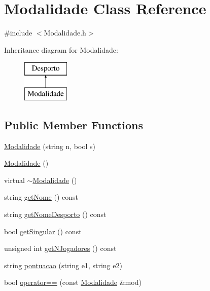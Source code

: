 \hypertarget{class_modalidade}{}\section{Modalidade Class Reference}
\label{class_modalidade}


{\ttfamily \#include $<$Modalidade.\+h$>$}

Inheritance diagram for Modalidade\+:\begin{figure}[H]
\begin{center}
\leavevmode
\includegraphics[height=2.000000cm]{class_modalidade}
\end{center}
\end{figure}
\subsection*{Public Member Functions}
\begin{DoxyCompactItemize}
\item 
\hyperlink{class_modalidade_a7d4201d3b89eb76cc5d147b642d32e72}{Modalidade} (string n, bool s)
\item 
\hyperlink{class_modalidade_aa60765d8148536471b4429e48858f883}{Modalidade} ()
\item 
virtual \hyperlink{class_modalidade_aea7526674a2128f030f58b8eff7c64bd}{$\sim$\+Modalidade} ()
\item 
string \hyperlink{class_modalidade_a46003f6a0dceac894f92971a6df9e4a7}{get\+Nome} () const 
\item 
string \hyperlink{class_modalidade_ac3326eec4d00a080b289ca249aa90cb7}{get\+Nome\+Desporto} () const 
\item 
bool \hyperlink{class_modalidade_acd8247f33c0aacef9388a2e452c06a19}{get\+Singular} () const 
\item 
unsigned int \hyperlink{class_modalidade_ae9016743d83bb1bd83ae1c076db5e65c}{get\+N\+Jogadores} () const 
\item 
string \hyperlink{class_modalidade_af7a45f3b8d73d45fd5cac46939344071}{pontuacao} (string e1, string e2)
\item 
bool \hyperlink{class_modalidade_a9f95f0d277728324be424570d69fc653}{operator==} (const \hyperlink{class_modalidade}{Modalidade} \&mod)
\end{DoxyCompactItemize}
